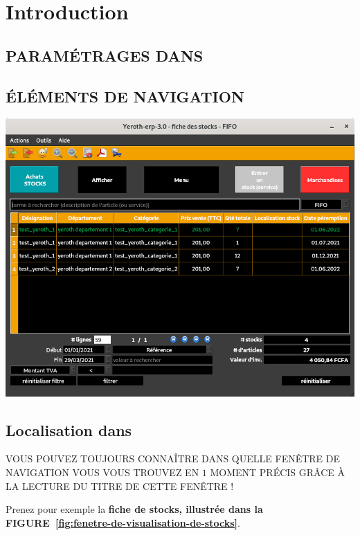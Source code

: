 \chapter{Introduction}

\vspace{-2em}


\vspace{1em}


\section{PARAM\'ETRAGES DANS \yerotherpblack}



\section{\'EL\'EMENTS DE NAVIGATION}

\begin{center}
\includegraphics[scale=0.52]{images/yeroth-erp-3-0-stocks-fenetre-screenshot.png}
\label{fig:fenetre-de-visualisation-de-stocks}
\end{center}


\newpage


\section{Localisation dans \yerotherpblack}

VOUS POUVEZ TOUJOURS CONNAÎTRE DANS QUELLE FEN\^ETRE
DE NAVIGATION VOUS VOUS TROUVEZ EN $1$ MOMENT PR\'ECIS
GRÂCE \`A LA LECTURE DU TITRE DE CETTE FEN\^ETRE !

Prenez pour exemple la \textbf{fiche de stocks, illustr\'ee
dans la FIGURE~\ref{fig:fenetre-de-visualisation-de-stocks}}.






